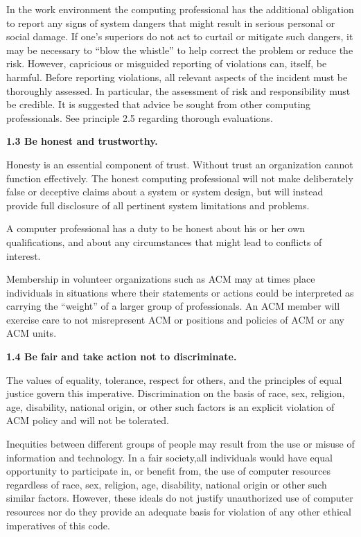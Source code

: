 In the work environment the computing professional has the additional obligation to report any signs of system dangers that might result in serious personal or social damage. If one's superiors do not act to curtail or mitigate such dangers, it may be necessary to ``blow the whistle'' to help correct the problem or reduce the risk. However, capricious or misguided reporting of violations can, itself, be harmful. Before reporting violations, all relevant aspects of the incident must be thoroughly assessed. In particular, the assessment of risk and responsibility must be credible. It is suggested that advice be sought from other computing professionals. See principle 2.5 regarding thorough evaluations.

\vspace{.1in}\noindent\textbf{1.3 Be honest and trustworthy.}

Honesty is an essential component of trust. Without trust an organization cannot function effectively. The honest computing professional will not make deliberately false or deceptive claims about a system or system design, but will instead provide full disclosure of all pertinent system limitations and problems.

A computer professional has a duty to be honest about his or her own qualifications, and about any circumstances that might lead to conflicts of interest.

Membership in volunteer organizations such as ACM may at times place individuals in situations where their statements or actions could be interpreted as carrying the ``weight'' of a larger group of professionals. An ACM member will exercise care to not misrepresent ACM or positions and policies of ACM or any ACM units.

\vspace{.1in}\noindent\textbf{1.4 Be fair and take action not to discriminate.}

The values of equality, tolerance, respect for others, and the principles of equal justice govern this imperative. Discrimination on the basis of race, sex, religion, age, disability, national origin, or other such factors is an explicit violation of ACM policy and will not be tolerated.

Inequities between different groups of people may result from the use or misuse of information and technology. In a fair society,all individuals would have equal opportunity to participate in, or benefit from, the use of computer resources regardless of race, sex, religion, age, disability, national origin or other such similar factors. However, these ideals do not justify unauthorized use of computer resources nor do they provide an adequate basis for violation of any other ethical imperatives of this code.

